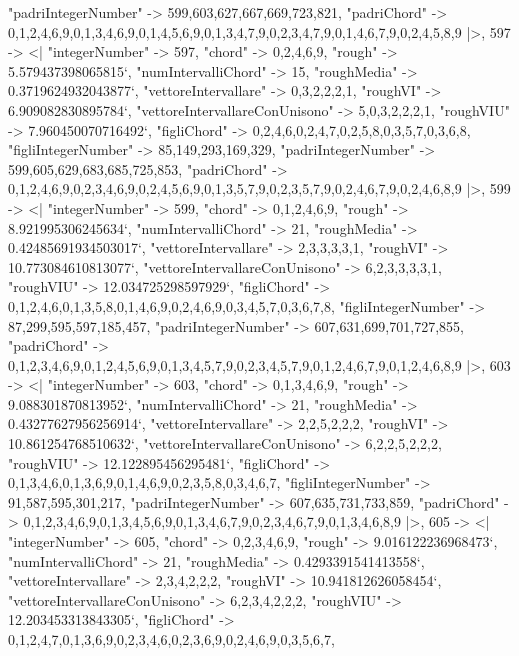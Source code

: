 \documentclass[
]{article}
\begin{document}
\begin{DatasetVerbatim}
    "padriIntegerNumber" -> {599,603,627,667,669,723,821},
    "padriChord" -> {{0,1,2,4,6,9},{0,1,3,4,6,9},{0,1,4,5,6,9},{0,1,3,4,7,9},{0,2,3,4,7,9},{0,1,4,6,7,9},{0,2,4,5,8,9}}
  |>,
  597 -> <|
    "integerNumber" -> 597,
    "chord" -> {0,2,4,6,9},
    "rough" -> 5.579437398065815`,
    "numIntervalliChord" -> 15,
    "roughMedia" -> 0.3719624932043877`,
    "vettoreIntervallare" -> {0,3,2,2,2,1},
    "roughVI" -> 6.909082830895784`,
    "vettoreIntervallareConUnisono" -> {5,0,3,2,2,2,1},
    "roughVIU" -> 7.960450070716492`,
    "figliChord" -> {{0,2,4,6},{0,2,4,7},{0,2,5,8},{0,3,5,7},{0,3,6,8}},
    "figliIntegerNumber" -> {85,149,293,169,329},
    "padriIntegerNumber" -> {599,605,629,683,685,725,853},
    "padriChord" -> {{0,1,2,4,6,9},{0,2,3,4,6,9},{0,2,4,5,6,9},{0,1,3,5,7,9},{0,2,3,5,7,9},{0,2,4,6,7,9},{0,2,4,6,8,9}}
  |>,
  599 -> <|
    "integerNumber" -> 599,
    "chord" -> {0,1,2,4,6,9},
    "rough" -> 8.921995306245634`,
    "numIntervalliChord" -> 21,
    "roughMedia" -> 0.42485691934503017`,
    "vettoreIntervallare" -> {2,3,3,3,3,1},
    "roughVI" -> 10.773084610813077`,
    "vettoreIntervallareConUnisono" -> {6,2,3,3,3,3,1},
    "roughVIU" -> 12.034725298597929`,
    "figliChord" -> {{0,1,2,4,6},{0,1,3,5,8},{0,1,4,6,9},{0,2,4,6,9},{0,3,4,5,7},{0,3,6,7,8}},
    "figliIntegerNumber" -> {87,299,595,597,185,457},
    "padriIntegerNumber" -> {607,631,699,701,727,855},
    "padriChord" -> {{0,1,2,3,4,6,9},{0,1,2,4,5,6,9},{0,1,3,4,5,7,9},{0,2,3,4,5,7,9},{0,1,2,4,6,7,9},{0,1,2,4,6,8,9}}
  |>,
  603 -> <|
    "integerNumber" -> 603,
    "chord" -> {0,1,3,4,6,9},
    "rough" -> 9.088301870813952`,
    "numIntervalliChord" -> 21,
    "roughMedia" -> 0.43277627956256914`,
    "vettoreIntervallare" -> {2,2,5,2,2,2},
    "roughVI" -> 10.861254768510632`,
    "vettoreIntervallareConUnisono" -> {6,2,2,5,2,2,2},
    "roughVIU" -> 12.122895456295481`,
    "figliChord" -> {{0,1,3,4,6},{0,1,3,6,9},{0,1,4,6,9},{0,2,3,5,8},{0,3,4,6,7}},
    "figliIntegerNumber" -> {91,587,595,301,217},
    "padriIntegerNumber" -> {607,635,731,733,859},
    "padriChord" -> {{0,1,2,3,4,6,9},{0,1,3,4,5,6,9},{0,1,3,4,6,7,9},{0,2,3,4,6,7,9},{0,1,3,4,6,8,9}}
  |>,
  605 -> <|
    "integerNumber" -> 605,
    "chord" -> {0,2,3,4,6,9},
    "rough" -> 9.016122236968473`,
    "numIntervalliChord" -> 21,
    "roughMedia" -> 0.4293391541413558`,
    "vettoreIntervallare" -> {2,3,4,2,2,2},
    "roughVI" -> 10.941812626058454`,
    "vettoreIntervallareConUnisono" -> {6,2,3,4,2,2,2},
    "roughVIU" -> 12.203453313843305`,
    "figliChord" -> {{0,1,2,4,7},{0,1,3,6,9},{0,2,3,4,6},{0,2,3,6,9},{0,2,4,6,9},{0,3,5,6,7}},

\end{DatasetVerbatim}
\end{document}
